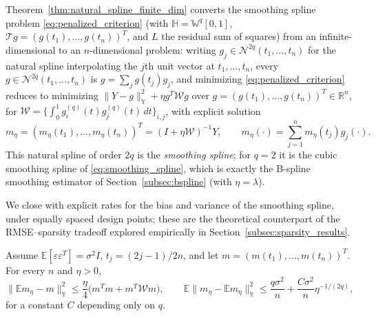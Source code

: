 Theorem~\ref{thm:natural_spline_finite_dim} converts the smoothing spline
problem \eqref{eq:penalized_criterion} (with $\mathbb{H}=\mathbb{W}^q
[0,1]$, $\mathcal{T}g=(g(t_1),\dots,g(t_n))^T$, and $L$ the residual sum
of squares) from an infinite-dimensional to an $n$-dimensional problem:
writing $g_j\in\mathcal{N}^{2q}(t_1,\dots,t_n)$ for the natural spline
interpolating the $j$th unit vector at $t_1,\dots,t_n$, every $g\in
\mathcal{N}^{2q}(t_1,\dots,t_n)$ is $g=\sum_jg(t_j)g_j$, and minimizing
\eqref{eq:penalized_criterion} reduces to minimizing $\|Y-g\|_{\mathbb{Y}}
^2+\eta g^T\mathcal{W}g$ over $g=(g(t_1),\dots,g(t_n))^T\in\mathbb{R}^n$,
for $\mathcal{W}=\{\int_0^1g_i^{(q)}(t)g_j^{(q)}(t)\,dt\}_{i,j}$, with
explicit solution
\begin{equation}
m_\eta = (m_\eta(t_1),\dots,m_\eta(t_n))^T = (I+\eta\mathcal{W})^{-1}Y,
\qquad m_\eta(\cdot) = \sum_{j=1}^nm_\eta(t_j)g_j(\cdot).
\label{eq:smoothing_spline_solution}
\end{equation}
This natural spline of order $2q$ is the \emph{smoothing spline}; for
$q=2$ it is the cubic smoothing spline of
\eqref{eq:smoothing_spline}, which is exactly the B-spline smoothing
estimator of Section~\ref{subsec:bspline} (with $\eta=\lambda$).

We close with explicit rates for the bias and variance of the smoothing
spline, under equally spaced design points; these are the theoretical
counterpart of the RMSE--sparsity tradeoff explored empirically in
Section~\ref{subsec:sparsity_results}.

\begin{theorem}
\label{thm:smoothing_spline_rates}
Assume $\mathbb{E}[\varepsilon\varepsilon^T]=\sigma^2I$, $t_j=(2j-1)/2n$,
and let $m=(m(t_1),\dots,m(t_n))^T$. For every $n$ and $\eta>0$,
\begin{equation}
\|\mathbb{E}m_\eta-m\|_{\mathbb{Y}}^2 \leq \frac{\eta}{4}\big(m^Tm+m^T
\mathcal{W}m\big), \qquad
\mathbb{E}\|m_\eta-\mathbb{E}m_\eta\|_{\mathbb{Y}}^2 \leq \frac{q\sigma^2}
{n} + \frac{C\sigma^2}{n}\eta^{-1/(2q)},
\label{eq:smoothing_spline_rates}
\end{equation}
for a constant $C$ depending only on $q$.
\end{theorem}

